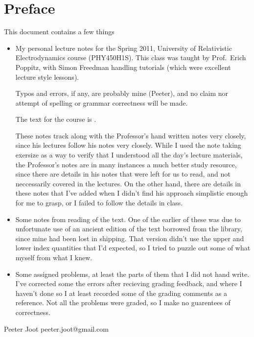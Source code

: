 \chapter*{Preface}\normalsize

This document contains a few things

\begin{itemize}
\item My personal lecture notes for the Spring 2011, University of Relativistic Electrodynamics course (PHY450H1S).  This class was taught by Prof.\ Erich Poppitz, with Simon Freedman handling tutorials (which were excellent lecture style lessons).

Typos and errors, if any, are probably mine (Peeter), and no claim nor attempt of spelling or grammar correctness will be made.  

The text for the course is \citep{landau1980classical}.

These notes track along with the Professor's hand written notes very closely, since his lectures follow his notes very closely.  While I used the note taking exersize as a way to verify that I understood all the day's lecture materials, the Professor's notes are in many instances a much better study resource, since there are details in his notes that were left for us to read, and not neccessarily covered in the lectures.  On the other hand, there are details in these notes that I've added when I didn't find his approach simplistic enough for me to grasp, or I failed to follow the details in class.

\item Some notes from reading of the text.  One of the earlier of these was due to unfortunate use of an ancient edition of the text borrowed from the library, since mine had been lost in shipping.  That version didn't use the upper and lower index quantities that I'd expected, so I tried to puzzle out some of what myself from what I knew.

\item Some assigned problems, at least the parts of them that I did not hand write.  I've corrected some the errors after recieving grading feedback, and where I haven't done so I at least recorded some of the grading comments as a reference.  Not all the problems were graded, so I make no guarentees of correctness.

%
\end{itemize}

Peeter Joot  \quad peeter.joot@gmail.com 
